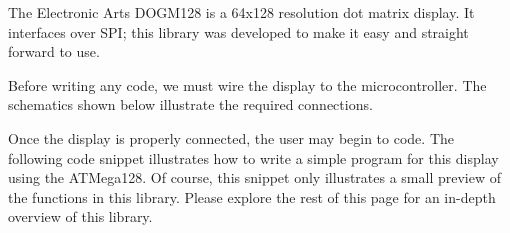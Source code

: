 The Electronic Arts D\-O\-G\-M128 is a 64x128 resolution dot matrix display. It interfaces over S\-P\-I; this library was developed to make it easy and straight forward to use. \par
\par
 Before writing any code, we must wire the display to the microcontroller. The schematics shown below illustrate the required connections.

\par
\par
  Once the display is properly connected, the user may begin to code. The following code snippet illustrates how to write a simple program for this display using the A\-T\-Mega128. Of course, this snippet only illustrates a small preview of the functions in this library. Please explore the rest of this page for an in-\/depth overview of this library.


